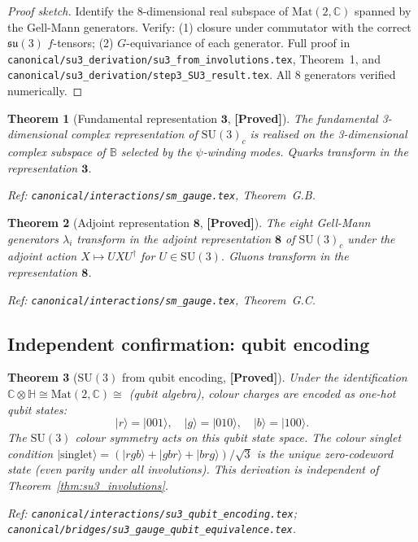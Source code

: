 \documentclass[12pt,a4paper]{article}
\newtheorem{theorem}{Theorem}[section]
\theoremstyle{definition}
\theoremstyle{remark}
\newcommand{\PROVED}{\textbf{[Proved]}}
\newcommand{\SU}[1]{\mathrm{SU}(#1)}
\newcommand{\Bq}{\mathbb{C}\otimes\mathbb{H}}
\begin{document}
\begin{proof}[Proof sketch]
Identify the 8-dimensional real subspace of $\mathrm{Mat}(2,\mathbb{C})$ spanned
by the Gell-Mann generators.  Verify: (1) closure under commutator with the
correct $\mathfrak{su}(3)$ $f$-tensors; (2) $G$-equivariance of each generator.
Full proof in \texttt{canonical/su3\_derivation/su3\_from\_involutions.tex},
Theorem~1, and \texttt{canonical/su3\_derivation/step3\_SU3\_result.tex}.
All 8 generators verified numerically.
\end{proof}

\begin{theorem}[Fundamental representation $\mathbf{3}$, \PROVED]
\label{thm:fundamental}
The fundamental 3-dimensional complex representation of $\SU{3}_c$ is
realised on the 3-dimensional complex subspace of $\mathbb{B}$ selected by
the $\psi$-winding modes.  Quarks transform in the representation $\mathbf{3}$.

Ref: \texttt{canonical/interactions/sm\_gauge.tex}, Theorem~G.B.
\end{theorem}

\begin{theorem}[Adjoint representation $\mathbf{8}$, \PROVED]
\label{thm:adjoint}
The eight Gell-Mann generators $\lambda_i$ transform in the adjoint
representation $\mathbf{8}$ of $\SU{3}_c$ under the adjoint action
$X\mapsto UXU^\dagger$ for $U\in\SU{3}$.  Gluons transform in the
representation $\mathbf{8}$.

Ref: \texttt{canonical/interactions/sm\_gauge.tex}, Theorem~G.C.
\end{theorem}

\subsection{Independent confirmation: qubit encoding}

\begin{theorem}[$\SU{3}$ from qubit encoding, \PROVED]
\label{thm:su3_qubit}
Under the identification $\Bq\cong\mathrm{Mat}(2,\mathbb{C})\cong$ (qubit algebra),
colour charges are encoded as one-hot qubit states:
\[
  |r\rangle = |001\rangle,\quad |g\rangle = |010\rangle,\quad |b\rangle = |100\rangle.
\]
The $\SU{3}$ colour symmetry acts on this qubit state space.  The colour singlet
condition $|{\mathrm{singlet}}\rangle = (|rgb\rangle + |gbr\rangle + |brg\rangle)/\sqrt{3}$
is the unique zero-codeword state (even parity under all involutions).
This derivation is independent of Theorem~\ref{thm:su3_involutions}.

Ref: \texttt{canonical/interactions/su3\_qubit\_encoding.tex};
\texttt{canonical/bridges/su3\_gauge\_qubit\_equivalence.tex}.
\end{theorem}
\end{document}

